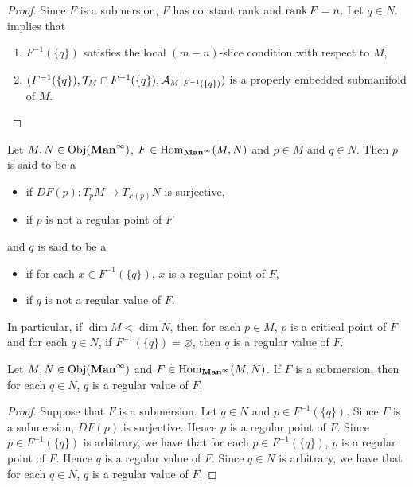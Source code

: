 \documentclass{book}
\begin{document}
	\begin{proof}
		Since $F$ is a submersion, $F$ has constant rank and $\operatorname{\text{rank}} F = n$. Let $q \in N$. \rex{}  implies that 
		\begin{enumerate}
			\item $F^{-1}(\{q\})$ satisfies the local $(m-n)$-slice condition with respect to $M$,
			\item $(F^{-1}(\{q\}), \mathcal{T}_M \cap F^{-1}(\{q\}), \mathcal{A}_M|_{F^{-1}(\{q\})})$ is a properly embedded submanifold of $M$.
		\end{enumerate}
	\end{proof}
	
	\begin{defn} 
		Let $M, N \in \operatorname{Obj}(\operatorname*{\text{\textbf{Man}}^{\infty}})$, $F \in \operatorname{Hom}_{\operatorname*{\text{\textbf{Man}}^{\infty}}}(M,N)$ and $p \in M$ and $q \in N$. Then $p$ is said to be a 
		\begin{itemize}
			\item {} if $DF(p):T_pM \rightarrow T_{F(p)} N$ is surjective,
			\item {} if $p$ is not a regular point of $F$
		\end{itemize} 
		and $q$ is said to be a 
		\begin{itemize}
			\item {} if for each $x \in F^{-1}(\{q\})$, $x$ is a regular point of $F$,
			\item {} if $q$ is not a regular value of $F$.
		\end{itemize} 
	\end{defn}

	\begin{note}
		In particular, if $\dim M < \dim N$, then for each $p \in M$, $p$ is a critical point of $F$ and for each $q \in N$, if $F^{-1}(\{q\}) = \varnothing$, then $q$ is a regular value of $F$. 
	\end{note}

	\begin{ex} 
		Let $M, N \in \operatorname{Obj}(\operatorname*{\text{\textbf{Man}}^{\infty}})$ and $F \in \operatorname{Hom}_{\operatorname*{\text{\textbf{Man}}^{\infty}}}(M,N)$. If $F$ is a submersion, then for each $q \in N$, $q$ is a regular value of $F$. 
	\end{ex}
	
	\begin{proof}
		Suppose that $F$ is a submersion. Let $q \in N$ and $p \in F^{-1}(\{q\})$. Since $F$ is a submersion, $DF(p)$ is surjective. Hence $p$ is a regular point of $F$. Since $p \in F^{-1}(\{q\})$ is arbitrary, we have that for each $p \in F^{-1}(\{q\})$, $p$ is a regular point of $F$. Hence $q$ is a regular value of $F$. Since $q \in N$ is arbitrary, we have that for each $q \in N$, $q$ is a regular value of $F$.
	\end{proof}
	
\end{document}
